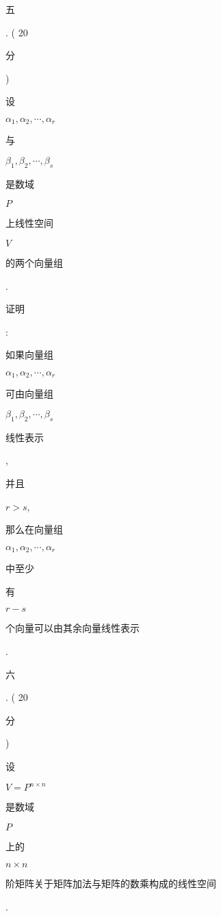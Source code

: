 \documentclass[10pt]{article}
\begin{document}
\begin{CJK}{UTF8}{mj}五\end{CJK}. ( 20 \begin{CJK}{UTF8}{mj}分\end{CJK}) \begin{CJK}{UTF8}{mj}设\end{CJK} $\alpha_{1}, \alpha_{2}, \cdots, \alpha_{r}$ \begin{CJK}{UTF8}{mj}与\end{CJK} $\beta_{1}, \beta_{2}, \cdots, \beta_{s}$ \begin{CJK}{UTF8}{mj}是数域\end{CJK} $P$ \begin{CJK}{UTF8}{mj}上线性空间\end{CJK} $V$ \begin{CJK}{UTF8}{mj}的两个向量组\end{CJK}. \begin{CJK}{UTF8}{mj}证明\end{CJK}: \begin{CJK}{UTF8}{mj}如果向量组\end{CJK} $\alpha_{1}, \alpha_{2}, \cdots, \alpha_{r}$ \begin{CJK}{UTF8}{mj}可由向量组\end{CJK} $\beta_{1}, \beta_{2}, \cdots, \beta_{s}$ \begin{CJK}{UTF8}{mj}线性表示\end{CJK}, \begin{CJK}{UTF8}{mj}并且\end{CJK} $r>s$, \begin{CJK}{UTF8}{mj}那么在向量组\end{CJK} $\alpha_{1}, \alpha_{2}, \cdots, \alpha_{r}$ \begin{CJK}{UTF8}{mj}中至少\end{CJK} \begin{CJK}{UTF8}{mj}有\end{CJK} $r-s$ \begin{CJK}{UTF8}{mj}个向量可以由其余向量线性表示\end{CJK}.

\begin{CJK}{UTF8}{mj}六\end{CJK}. ( 20 \begin{CJK}{UTF8}{mj}分\end{CJK}) \begin{CJK}{UTF8}{mj}设\end{CJK} $V=P^{n \times n}$ \begin{CJK}{UTF8}{mj}是数域\end{CJK} $P$ \begin{CJK}{UTF8}{mj}上的\end{CJK} $n \times n$ \begin{CJK}{UTF8}{mj}阶矩阵关于矩阵加法与矩阵的数乘构成的线性空间\end{CJK}.
\end{document}
